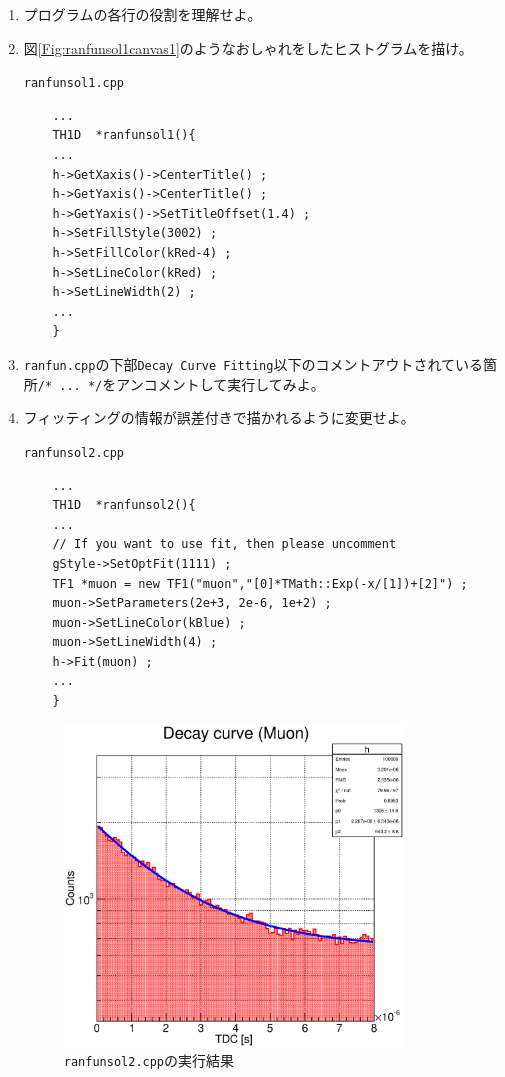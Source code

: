 \documentclass{jarticle}
\begin{document}
  \begin{enumerate}
   \item プログラムの各行の役割を理解せよ。

   \item 図\ref{Fig:ranfunsol1canvas1}のようなおしゃれをしたヒストグラムを描け。
	 \begin{itembox}{\texttt{ranfunsol1.cpp}}
\begin{verbatim}
	...
	TH1D  *ranfunsol1(){ 
	...
	h->GetXaxis()->CenterTitle() ;
	h->GetYaxis()->CenterTitle() ;
	h->GetYaxis()->SetTitleOffset(1.4) ;
	h->SetFillStyle(3002) ;
	h->SetFillColor(kRed-4) ;
	h->SetLineColor(kRed) ;
	h->SetLineWidth(2) ;
	...
	}
\end{verbatim}
	 \end{itembox}

   \item \verb|ranfun.cpp|の下部\verb|Decay Curve Fitting|以下のコメントアウトされている箇所\verb|/* ... */|をアンコメントして実行してみよ。

   \item フィッティングの情報が誤差付きで描かれるように変更せよ。
	 \begin{itembox}{\texttt{ranfunsol2.cpp}}
\begin{verbatim}
	...
	TH1D  *ranfunsol2(){ 
	...
	// If you want to use fit, then please uncomment
	gStyle->SetOptFit(1111) ;
	TF1 *muon = new TF1("muon","[0]*TMath::Exp(-x/[1])+[2]") ;
	muon->SetParameters(2e+3, 2e-6, 1e+2) ;
	muon->SetLineColor(kBlue) ;
	muon->SetLineWidth(4) ;
	h->Fit(muon) ;
	...
	}
\end{verbatim}
	 \end{itembox}
	 \begin{figure}[htbp]
	  \begin{center}
	   \includegraphics[width = 90mm]{./picture/ranfunsol2canvas1.eps}
	  \end{center}
	  \caption{\texttt{ranfunsol2.cpp}の実行結果}
	  \label{Fig:ranfunsol2canvas1}
	 \end{figure}

  \end{enumerate}
\end{document}
